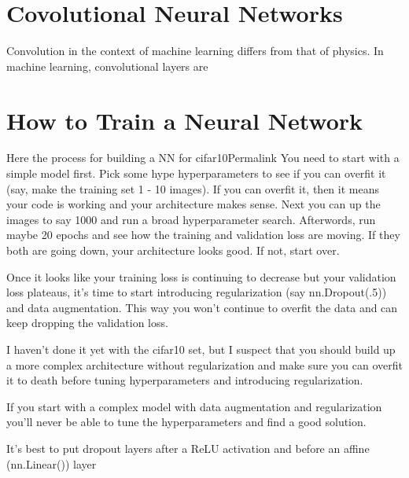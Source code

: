 \section{Covolutional Neural Networks}
Convolution in the context of machine learning differs from that of physics. In machine learning, convolutional layers are 

\section{How to Train a Neural Network}
Here the process for building a NN for cifar10Permalink
You need to start with a simple model first. Pick some hype hyperparameters to see if you can overfit it (say, make the training set 1 - 10 images). If you can overfit it, then it means your code is working and your architecture makes sense. Next you can up the images to say 1000 and run a broad hyperparameter search. Afterwords, run maybe 20 epochs and see how the training and validation loss are moving. If they both are going down, your architecture looks good. If not, start over.

Once it looks like your training loss is continuing to decrease but your validation loss plateaus, it’s time to start introducing regularization (say nn.Dropout(.5)) and data augmentation. This way you won’t continue to overfit the data and can keep dropping the validation loss.

I haven’t done it yet with the cifar10 set, but I suspect that you should build up a more complex architecture without regularization and make sure you can overfit it to death before tuning hyperparameters and introducing regularization.

If you start with a complex model with data augmentation and regularization you’ll never be able to tune the hyperparameters and find a good solution.

It’s best to put dropout layers after a ReLU activation and before an affine (nn.Linear()) layer






